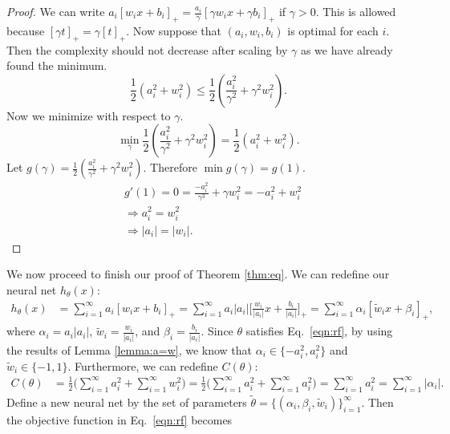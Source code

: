 \begin{proof}
	We can write $a_i[w_ix + b_i]_+ = \frac{a_i}{\gamma}[\gamma w_ix + \gamma b_i]_+$ if $\gamma > 0$. This is allowed because $[\gamma t]_+ = \gamma[t]_+$.
	Now suppose that $(a_i,w_i,b_i)$ is optimal for each $i$. Then the complexity should not decrease after scaling by $\gamma$ as we have already found the minimum.
	\begin{equation}
		\frac{1}{2}(a_i^2 + w_i^2) \leq \frac{1}{2}(\frac{a_i^2}{\gamma^2} + \gamma^2 w_i^2).
	\end{equation}
	Now we minimize with respect to $\gamma$.
	\begin{equation}
		\min_{\gamma} \frac{1}{2}(\frac{a_i^2}{\gamma^2} + \gamma^2 w_i^2) = \frac{1}{2}(a_i^2 + w_i^2).
	\end{equation}
	Let $g(\gamma) = \frac{1}{2}(\frac{a_i^2}{\gamma^2} + \gamma^2 w_i^2)$. Therefore $\min g(\gamma) = g(1)$.
	\begin{align*}
		& g'(1) = 0 = \frac{-a_i^2}{\gamma^3} + \gamma w_i^2 = -a_i^2 + w_i^2 \\
		& \Rightarrow a_i^2 = w_i^2 \\
		& \Rightarrow |a_i| = |w_i|.
	\end{align*}
\end{proof} 
 We now proceed to finish our proof of Theorem \ref{thm:eq}. We can redefine our neural net $h_\theta(x)$: 
\[
\begin{split}
h_\theta(x) &= \sum_{i=1}^\infty a_i [w_ix+b_i]_+ = \sum_{i=1}^\infty a_i |a_i| \bigg[\frac{w_i}{|a_i|} x + \frac{b_i}{|a_i|}\bigg]_+ = \sum_{i=1}^\infty \alpha_i [\widetilde w_i x + \beta_i]_+,
\end{split}
\]
where $\alpha_i = a_i |a_i|$, $\widetilde w_i = \frac{w_i}{|a_i|}$, and $\beta_i = \frac{b_i}{|a_i|}$. Since $\theta$ satisfies Eq.~\eqref{eqn:rf}, by using the results of Lemma \ref{lemma:a=w}, we know that $\alpha_i \in \{-a_i^2, a_i^2\}$ and $\widetilde w_i \in \{-1, 1\}$. Furthermore, we can redefine $C(\theta)$:
\[
\begin{split}
C(\theta) &= \frac{1}{2} \bigg(\sum_{i=1}^\infty a_i^2 + \sum_{i=1}^\infty w_i^2\bigg) = \frac{1}{2} \bigg(\sum_{i=1}^\infty a_i^2 + \sum_{i=1}^\infty a_i^2\bigg) = \sum_{i=1}^\infty a_i^2 = \sum_{i=1}^\infty |\alpha_i|.
\end{split}
\]
Define a new neural net by the set of parameters $\widetilde \theta = \{(\alpha_i, \beta_i, \widetilde w_i)\}_{i=1}^\infty$. Then the objective function in Eq.~\eqref{eqn:rf} becomes

